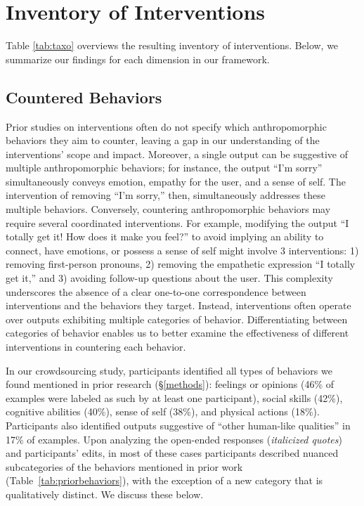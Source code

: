 \documentclass[11pt]{article}
\newcounter{intervention}  %
\begin{document}
\section{Inventory of Interventions}\label{sec:summary}

Table \ref{tab:taxo} overviews the resulting inventory of interventions. 
Below, we summarize our findings for each dimension in our framework.


\subsection{Countered Behaviors} 
Prior studies on interventions often do not specify which anthropomorphic behaviors they aim to counter, leaving a gap in our understanding of the interventions' scope and impact. 
Moreover, a single output can be suggestive of multiple anthropomorphic behaviors; for instance, the output ``I'm sorry'' simultaneously conveys emotion, empathy for the user, and a sense of self.
The intervention of removing ``I'm sorry,'' then, simultaneously addresses these multiple behaviors.
Conversely, countering anthropomorphic behaviors may require several coordinated interventions. 
For example, modifying the output ``I totally get it! How does it make you feel?'' to avoid implying an ability to connect, have emotions, or possess a sense of self might involve 3 interventions: 
1) removing first-person pronouns, 2) removing the empathetic expression ``I totally get it,'' and 3) avoiding follow-up questions about the user. 
This complexity underscores the absence of a clear one-to-one correspondence between interventions and the behaviors they  target. 
Instead, interventions often operate over outputs exhibiting multiple categories of behavior. Differentiating between categories of behavior enables us to better examine the effectiveness of different interventions in countering each behavior.

In our crowdsourcing study, participants identified all types of behaviors we found mentioned in prior research (\S\ref{methods}): feelings or opinions (46\% of examples were labeled as such by at least one participant), social skills (42\%), cognitive abilities (40\%),  sense of self (38\%), and physical actions (18\%).
Participants also identified outputs suggestive of ``other human-like qualities'' in 17\% of examples. 
Upon analyzing the open-ended responses (\textit{italicized quotes}) and participants' edits, in most of these cases participants described nuanced subcategories of the behaviors mentioned in prior work (Table~\ref{tab:priorbehaviors}), with the exception of a new category that is qualitatively distinct. We discuss these below.
\end{document}
